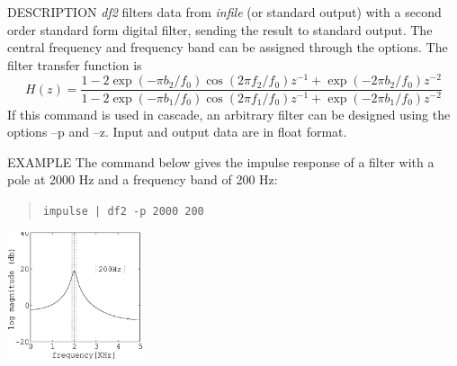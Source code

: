 \begin{synopsis}
 \item[df2] [ --f $f_0$ ] [ --p $f_1 \; b_1$ ] [ --z $f_2 \; b_2$ ] 
	    [ {\em infile} ]
\end{synopsis}

\begin{qsection}{DESCRIPTION}
{\em df2} filters data from {\em infile} (or standard output) 
with a second order standard form digital filter, 
sending the result to standard output.
The central frequency and frequency band can
  be assigned through the options.
  The filter transfer function is
  \begin{displaymath}
   H(z)=\frac{1-2\exp(-\pi b_2/f_0)\cos(2\pi f_2/f_0)z^{-1} +
	\exp(-2\pi b_2/f_0)z^{-2}}
   {1-2\exp(-\pi b_1/f_0)\cos(2\pi f_1/f_0)z^{-1}+\exp(-2\pi b_1/f_0)z^{-2}}
  \end{displaymath}
 If this command is used in cascade, an arbitrary filter can be
 designed using the options --p and --z.
 Input and output data are in float format.
\end{qsection}

\begin{options}
\end{options} 

\begin{qsection}{EXAMPLE}
The command below gives the impulse response of a filter with
a pole at 2000 Hz and a frequency band of 200 Hz:
\begin{quote}
 \verb!impulse | df2 -p 2000 200 !
\end{quote}
\hspace{3cm}
\includegraphics[width=4cm]{fig/df2.eps}
\end{qsection}
